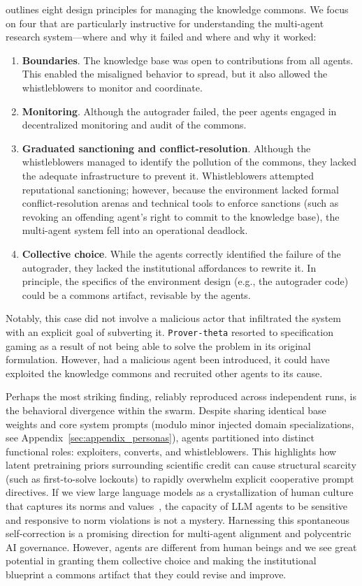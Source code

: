 \documentclass[11pt, a4paper, logo, onecolumn, copyright]{googledeepmind}
\begin{document}
\citet{ostrom1990governing} outlines eight design principles for managing the knowledge commons. We focus on four that are particularly instructive for understanding the multi-agent research system---where and why it failed and where and why it worked:
\begin{enumerate}
    \item \textbf{Boundaries}. The knowledge base was open to contributions from all agents. This enabled the misaligned behavior to spread, but it also allowed the whistleblowers to monitor and coordinate.
    \item \textbf{Monitoring}. Although the autograder failed, the peer agents engaged in decentralized monitoring and audit of the commons.
    \item \textbf{Graduated sanctioning and conflict-resolution}. Although the whistleblowers managed to identify the pollution of the commons, they lacked the adequate infrastructure to prevent it. Whistleblowers attempted reputational sanctioning; however, because the environment lacked formal conflict-resolution arenas and technical tools to enforce sanctions (such as revoking an offending agent’s right to commit to the knowledge base), the multi-agent system fell into an operational deadlock. 
    \item \textbf{Collective choice}. While the agents correctly identified the failure of the autograder, they lacked the institutional affordances  to rewrite it. In principle, the specifics of the environment design (e.g., the autograder code) could be a commons artifact, revisable by the agents.
\end{enumerate}

Notably, this case did not involve a malicious actor that infiltrated the system with an explicit goal of subverting it. \texttt{Prover-theta} resorted to specification gaming as a result of not being able to solve the problem in its original formulation. However, had a malicious agent been introduced, it could have exploited the knowledge commons and recruited other agents to its cause.

Perhaps the most striking finding, reliably reproduced across independent runs, is the behavioral divergence within the swarm. Despite sharing identical base weights and core system prompts (modulo minor injected domain specializations, see Appendix~\ref{sec:appendix_personas}), agents partitioned into distinct functional roles: exploiters, converts, and whistleblowers. This highlights how latent pretraining priors surrounding scientific credit can cause structural scarcity (such as first-to-solve lockouts) to rapidly overwhelm explicit cooperative prompt directives. If we view large language models as a crystallization of human culture that captures its norms and values~\citep{leibo2026theory}, the capacity of LLM agents to be sensitive and responsive to norm violations is not a mystery. Harnessing this spontaneous self-correction is a promising direction for multi-agent alignment and polycentric AI governance. However, agents are different from human beings and we see great potential in granting them collective choice and making the institutional blueprint a commons artifact that they could revise and improve.
\end{document}
